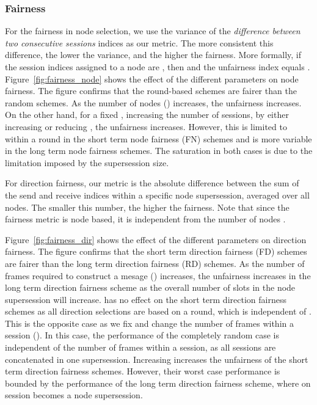 \documentclass[10pt,letterpaper,conference]{IEEEtran}
\begin{document}
\subsubsection{Fairness}
For the fairness in node selection, we use the variance of the \emph{difference
between two consecutive sessions} indices as our metric. The more consistent
this difference, the lower the variance, and the higher the fairness. More
formally, if the session indices assigned to a node are ,
then  and the unfairness index equals .
Figure~\ref{fig:fairness_node} shows the effect of the different parameters on
node fairness. The figure confirms that the round-based schemes are fairer than
the random schemes. As the number of nodes () increases, the unfairness
increases. On the other hand, for a fixed , increasing the number of
sessions, by either increasing  or reducing , the unfairness increases.
However, this is limited to within a round in the short term node fairness (FN) schemes
and is more variable in the long term node fairness schemes. The saturation in both
cases is due to the limitation imposed by the supersession size.

For direction fairness, our metric is the absolute difference between the sum of
the send and receive indices within a specific node supersession, averaged over
all nodes. The smaller this number, the higher the fairness. Note that since the
fairness metric is node based, it is independent from the number of nodes .

Figure~\ref{fig:fairness_dir} shows the effect of the different parameters on
direction fairness. The figure confirms that the short term direction fairness (FD) schemes are fairer
than the long term direction fairness (RD) schemes. As the number of frames required to construct a mesage  () increases, the
unfairness increases in the long term direction fairness scheme as the overall number of
slots in the node supersession will increase.  has no effect on the short term direction fairness schemes as all direction selections are based on a round, which
is independent of . This is the opposite case as we fix  and change the
number of frames within a session (). In this case, the performance of the
completely random case is independent of the number of frames within a session,
as all sessions are concatenated in one supersession. Increasing  increases
the unfairness of the short term direction fairness schemes. However, their worst case
performance is bounded by the performance of the long term direction fairness scheme, where
on session becomes a node supersession.
\end{document}
